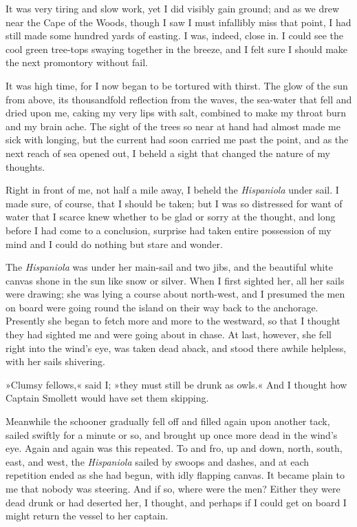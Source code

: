 It was very tiring and slow work, yet I did visibly gain ground; and as we drew near the Cape of the Woods, though I saw I must infallibly miss that point, I had still made some hundred yards of easting. I was, indeed, close in. I could see the cool green tree-tops swaying together in the breeze, and I felt sure I should make the next promontory without fail.

It was high time, for I now began to be tortured with thirst. The glow of the sun from above, its thousandfold reflection from the waves, the sea-water that fell and dried upon me, caking my very lips with salt, combined to make my throat burn and my brain ache. The sight of the trees so near at hand had almost made me sick with longing, but the current had soon carried me past the point, and as the next reach of sea opened out, I beheld a sight that changed the nature of my thoughts.

Right in front of me, not half a mile away, I beheld the \textit{Hispaniola} under sail. I made sure, of course, that I should be taken; but I was so distressed for want of water that I scarce knew whether to be glad or sorry at the thought, and long before I had come to a conclusion, surprise had taken entire possession of my mind and I could do nothing but stare and wonder.

The \textit{Hispaniola} was under her main-sail and two jibs, and the beautiful white canvas shone in the sun like snow or silver. When I first sighted her, all her sails were drawing; she was lying a course about north-west, and I presumed the men on board were going round the island on their way back to the anchorage. Presently she began to fetch more and more to the westward, so that I thought they had sighted me and were going about in chase. At last, however, she fell right into the wind's eye, was taken dead aback, and stood there awhile helpless, with her sails shivering.

»Clumsy fellows,« said I; »they must still be drunk as owls.« And I thought how Captain Smollett would have set them skipping.

Meanwhile the schooner gradually fell off and filled again upon another tack, sailed swiftly for a minute or so, and brought up once more dead in the wind's eye. Again and again was this repeated. To and fro, up and down, north, south, east, and west, the \textit{Hispaniola} sailed by swoops and dashes, and at each repetition ended as she had begun, with idly flapping canvas. It became plain to me that nobody was steering. And if so, where were the men? Either they were dead drunk or had deserted her, I thought, and perhaps if I could get on board I might return the vessel to her captain.

